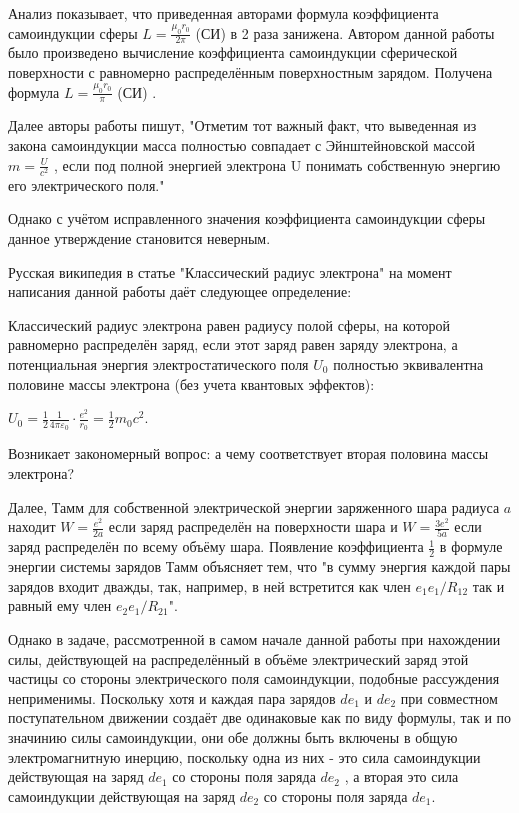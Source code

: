 \documentclass{article}
\begin{document}
Анализ показывает, что приведенная авторами формула коэффициента самоиндукции сферы $L =\frac{{{\mu }_{0}}{r}_{0}}{2\pi }$ (СИ) в 2 раза занижена. Автором данной работы было произведено вычисление коэффициента самоиндукции сферической поверхности с равномерно распределённым поверхностным зарядом. Получена формула $L =\frac{{{\mu }_{0}}{r}_{0}}{\pi }$ (СИ) .

Далее авторы  работы \cite{misyuchenko} пишут, "Отметим тот важный факт, что выведенная из закона самоиндукции масса полностью совпадает с Эйнштейновской массой $m=\frac{U}{c^2}$ , если под полной энергией электрона U понимать собственную энергию его электрического поля."

Однако с учётом исправленного значения коэффициента самоиндукции сферы данное утверждение становится неверным. 

Русская википедия в статье "Классический радиус электрона"  на момент написания данной работы даёт следующее определение:

Классический радиус электрона равен радиусу полой сферы, на которой равномерно распределён заряд, если этот заряд равен заряду электрона, а потенциальная энергия электростатического поля ${U}_{0}$  полностью эквивалентна половине массы электрона (без учета квантовых эффектов):

${\displaystyle U_{0}={\frac {1}{2}}{\frac {1}{4\pi \varepsilon _{0}}}\cdot {\frac {e^{2}}{r_{0}}}={\frac {1}{2}}m_{0}c^{2}}$.

Возникает закономерный вопрос: а чему соответствует вторая половина массы электрона?

Далее, Тамм \cite{tamm} для собственной электрической энергии заряженного шара радиуса $a$ находит $W=\frac{e^2}{2a}$ если заряд распределён на поверхности шара и $W=\frac{3e^2}{5a}$ если заряд распределён по всему объёму шара. Появление коэффициента $\frac{1}{2}$  в формуле энергии системы зарядов Тамм объясняет тем, что "в сумму энергия каждой пары зарядов входит дважды, так, например, в ней встретится как член ${e_{1}}{e_{1}}/{R_{12}}$ так и равный ему член ${e_{2}}{e_{1}}/{R_{21}}$".

Однако в задаче, рассмотренной в самом начале данной работы при нахождении силы, действующей на распределённый в объёме электрический заряд этой частицы со стороны электрического поля самоиндукции, подобные рассуждения неприменимы. Поскольку хотя и каждая пара зарядов $d{e}_{1}$ и $d{e}_{2}$ при совместном поступательном движении создаёт две одинаковые как по виду формулы, так и по значинию силы самоиндукции, они обе должны быть включены в общую электромагнитную инерцию, поскольку одна из них - это сила самоиндукции действующая на заряд $d{e}_{1}$  со стороны поля заряда $d{e}_{2}$ , а вторая это сила самоиндукции действующая на заряд $d{e}_{2}$  со стороны поля заряда $d{e}_{1}$.
\end{document}
